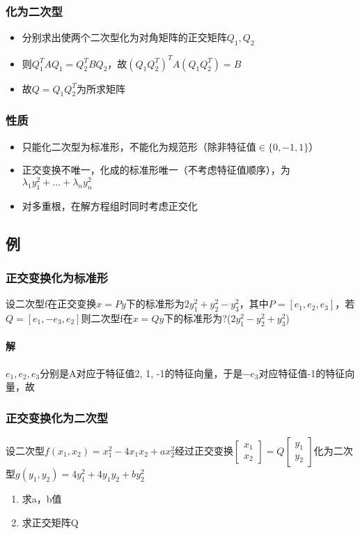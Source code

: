 \subsubsection{化为二次型}
\begin{itemize}
    \item 分别求出使两个二次型化为对角矩阵的正交矩阵\(Q_1, Q_2\)
    \item 则\(Q_1^TAQ_1 = Q_2^TBQ_2\)，故\((Q_1Q_2^T)^TA(Q_1Q_2^T) = B\)
    \item 故\(Q = Q_1Q_2^T\)为所求矩阵
\end{itemize}


\subsubsection{性质}
\begin{itemize}
    \item 只能化二次型为标准形，不能化为规范形（除非特征值\(\in \{0, -1, 1\}\)）
    \item 正交变换不唯一，化成的标准形唯一（不考虑特征值顺序），为\(\lambda_1y_1^2 + ... + \lambda_ny_n^2\)
    \item 对多重根，在解方程组时同时考虑正交化
\end{itemize}


\subsection{例}

\subsubsection{正交变换化为标准形}
设二次型f在正交变换\(x = Py\)下的标准形为\(2y_1^2 + y_2^2 - y_3^2\)，其中\(P = [e_1, e_2, e_3]\)，若\(Q = [e_1, -e_3, e_2]\)则二次型f在\(x = Qy\)下的标准形为?(\(2y_1^2 - y_2^2 + y_3^2\))

\paragraph{解}
\(e_1, e_2, e_3\)分别是A对应于特征值2, 1, -1的特征向量，于是\(-e_3\)对应特征值-1的特征向量，故


\subsubsection{正交变换化为二次型}
设二次型\(f(x_1, x_2) = x_1^2 - 4x_1x_2 + ax_2^2\)经过正交变换\(\begin{bmatrix}
    x_1 \\ 
    x_2
\end{bmatrix} = Q\begin{bmatrix}
    y_1 \\ 
    y_2
\end{bmatrix}\)化为二次型\(g(y_1, y_2) = 4y_1^2 + 4y_1y_2 + by_2^2\)
\begin{enumerate}
    \item 求a，b值
    \item 求正交矩阵Q
\end{enumerate}

